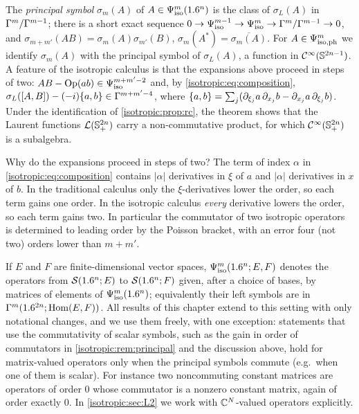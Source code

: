 \begin{remark}\label{isotropic:rem:principal}
The \emph{principal symbol} $\sigma_m(A)$ of $A\in\Psi^{m}_{\mathrm{iso}}(1.6^n)$ is the
class of $\sigma_L(A)$ in $\Gamma^{m}/\Gamma^{m-1}$; there is a short exact sequence
$0\to\Psi^{m-1}_{\mathrm{iso}}\to\Psi^{m}_{\mathrm{iso}}\to\Gamma^{m}/\Gamma^{m-1}\to0$, and
$\sigma_{m+m'}(AB)=\sigma_m(A)\sigma_{m'}(B)$, $\sigma_m(A^*)=\overline{\sigma_m(A)}$.
For $A\in\Psi^{m}_{\mathrm{iso,ph}}$ we identify $\sigma_m(A)$ with the principal symbol of
$\sigma_L(A)$, a function in $\mathcal{C}^\infty(\mathbb{S}^{2n-1})$. A feature of the isotropic
calculus is that the expansions above proceed in steps of two: $AB-\operatorname{Op}(ab)\in\Psi^{m+m'-2}_{\mathrm{iso}}$
and, by \eqref{isotropic:eq:composition},
$\sigma_L([A,B])-(-i)\{a,b\}\in\Gamma^{m+m'-4}$, where
$\{a,b\}=\sum_j(\partial_{\xi_j}a\,\partial_{x_j}b-\partial_{x_j}a\,\partial_{\xi_j}b)$. Under the
identification of \cref{isotropic:prop:rc}, the theorem shows that the
Laurent functions $\mathcal L(\mathbb{S}^{2n}_{+})$ carry a non-commutative product, for
which $\mathcal{C}^\infty(\mathbb{S}^{2n}_{+})$ is a subalgebra.
\end{remark}

\begin{discussion}
Why do the expansions proceed in steps of two? The term of index $\alpha$ in
\eqref{isotropic:eq:composition} contains $|\alpha|$ derivatives in $\xi$ of
$a$ and $|\alpha|$ derivatives in $x$ of $b$. In the traditional calculus
only the $\xi$-derivatives lower the order, so each term gains one order. In
the isotropic calculus \emph{every} derivative lowers the order, so each term
gains two. In particular the commutator of two isotropic operators is
determined to leading order by the Poisson bracket, with an error four (not
two) orders lower than $m+m'$.
\end{discussion}

\begin{remark}\label{isotropic:rem:vector}
If $E$ and $F$ are finite-dimensional vector spaces, $\Psi^{m}_{\mathrm{iso}}(1.6^n;E,F)$
denotes the operators from $\mathcal{S}(1.6^n;E)$ to $\mathcal{S}(1.6^n;F)$ given, after a choice
of bases, by matrices of elements of $\Psi^{m}_{\mathrm{iso}}(1.6^n)$; equivalently their
left symbols are in $\Gamma^{m}(1.6^{2n};\operatorname{Hom}(E,F))$. All results of this chapter
extend to this setting with only notational changes, and we use them freely,
with one exception: statements that use the commutativity of scalar symbols,
such as the gain in order of commutators in \cref{isotropic:rem:principal}
and the discussion above, hold for matrix-valued operators only when the
principal symbols commute (e.g.\ when one of them is scalar). For instance two
noncommuting constant matrices are operators of order $0$ whose commutator is
a nonzero constant matrix, again of order exactly $0$. In
\cref{isotropic:sec:L2} we work with $\mathbb{C}^N$-valued operators explicitly.
\end{remark}

